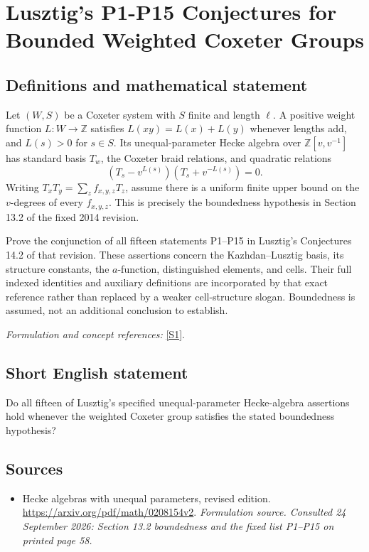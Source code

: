 \documentclass[11pt]{article}
\begin{document}
\section*{\texorpdfstring{Lusztig's P1-P15 Conjectures for Bounded Weighted Coxeter Groups}{Lusztig's P1-P15 Conjectures for Bounded Weighted Coxeter Groups}}\label{464}
\subsection{Definitions and mathematical statement}
Let $(W,S)$ be a Coxeter system with $S$ finite and length $\ell$. A positive weight function $L:W\to{\mathbb{Z}}$ satisfies $L(xy)=L(x)+L(y)$ whenever lengths add, and $L(s)>0$ for $s\in S$. Its unequal-parameter Hecke algebra over ${\mathbb{Z}}[v,v^{-1}]$ has standard basis $T_w$, the Coxeter braid relations, and quadratic relations
\[
 (T_s-v^{L(s)})(T_s+v^{-L(s)})=0.
\]
Writing $T_xT_y=\sum_zf_{x,y,z}T_z$, assume there is a uniform finite upper bound on the $v$-degrees of every $f_{x,y,z}$. This is precisely the boundedness hypothesis in Section 13.2 of the fixed 2014 revision.

Prove the conjunction of all fifteen statements P1--P15 in Lusztig's Conjectures 14.2 of that revision. These assertions concern the Kazhdan--Lusztig basis, its structure constants, the $a$-function, distinguished elements, and cells. Their full indexed identities and auxiliary definitions are incorporated by that exact reference rather than replaced by a weaker cell-structure slogan. Boundedness is assumed, not an additional conclusion to establish.
\par\smallskip\textit{Formulation and concept references:} \href{https://arxiv.org/pdf/math/0208154v2}{[S1]}.

\subsection{Short English statement}
Do all fifteen of Lusztig's specified unequal-parameter Hecke-algebra assertions hold whenever the weighted Coxeter group satisfies the stated boundedness hypothesis?
\subsection{Sources}
\begin{itemize}
\item[S1]Hecke algebras with unequal parameters, revised edition.
\url{https://arxiv.org/pdf/math/0208154v2}.
\textit{Formulation source. Consulted 24 September 2026: Section 13.2 boundedness and the fixed list P1–P15 on printed page 58.}
\end{itemize}
\end{document}
